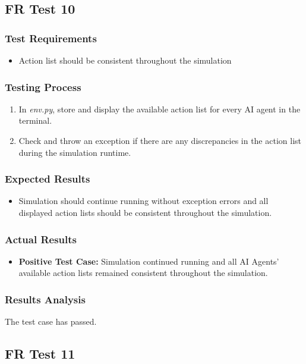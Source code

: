 \documentclass[12pt, titlepage]{article}
\begin{document}
\subsection{FR Test 10}
\subsubsection{Test Requirements}
\begin{itemize}
    \item Action list should be consistent throughout the simulation
\end{itemize}
\subsubsection{Testing Process}
\begin{enumerate}
    \item In \textit{env.py}, store and display the available action list for every AI agent in the terminal. 
    \item Check and throw an exception if there are any discrepancies in the action list during the simulation runtime.
\end{enumerate}
\subsubsection{Expected Results}
\begin{itemize}
    \item Simulation should continue running without exception errors and all displayed action lists should be consistent throughout the simulation.
\end{itemize}
\subsubsection{Actual Results}
\begin{itemize}
    \item \textbf{Positive Test Case:} Simulation continued running and all AI Agents' available action lists remained consistent throughout the simulation.
\end{itemize}
\subsubsection{Results Analysis}
The test case has passed.

\subsection{FR Test 11}
\end{document}
